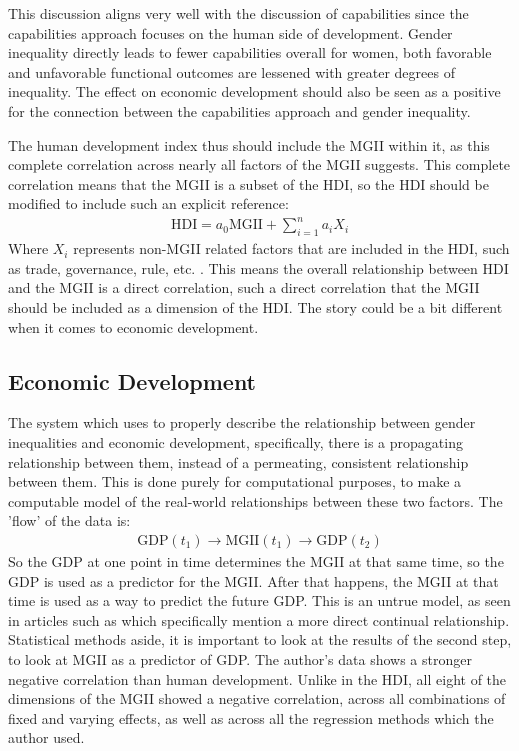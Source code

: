 \documentclass[12pt, letterpaper]{article}
\begin{document}
This discussion aligns very well with the discussion of capabilities since the capabilities approach focuses on the human side of development. Gender inequality directly leads to fewer capabilities overall for women, both favorable and unfavorable functional outcomes are lessened with greater degrees of inequality. The effect on economic development should also be seen as a positive for the connection between the capabilities approach and gender inequality.

The human development index thus should include the MGII within it, as this complete correlation across nearly all factors of the MGII suggests. This complete correlation means that the MGII is a subset of the HDI, so the HDI should be modified to include such an explicit reference:
\begin{align*}
  \text{HDI}=a_0\text{MGII}+\sum_{i=1}^na_iX_i
\end{align*}
Where $X_i$ represents non-MGII related factors that are included in the HDI, such as trade, governance, rule, etc. \cite{ferrant}. This means the overall relationship between HDI and the MGII is a direct correlation, such a direct correlation that the MGII should be included as a dimension of the HDI. The story could be a bit different when it comes to economic development.

\subsection{Economic Development}
The system which \cite{ferrant} uses to properly describe the relationship between gender inequalities and economic development, specifically, there is a propagating relationship between them, instead of a permeating, consistent relationship between them. This is done purely for computational purposes, to make a computable model of the real-world relationships between these two factors. The 'flow' of the data is:
\begin{align*}
  \text{GDP}(t_1)\rightarrow\text{MGII}(t_1)\rightarrow\text{GDP}(t_2)
\end{align*}
So the GDP at one point in time determines the MGII at that same time, so the GDP is used as a predictor for the MGII. After that happens, the MGII at that time is used as a way to predict the future GDP. This is an untrue model, as seen in articles such as \cite{foho} which specifically mention a more direct continual relationship. Statistical methods aside, it is important to look at the results of the second step, to look at MGII as a predictor of GDP. The author's data shows a stronger negative correlation than human development. Unlike in the HDI, all eight of the dimensions of the MGII showed a negative correlation, across all combinations of fixed and varying effects, as well as across all the regression methods which the author used.
\end{document}
